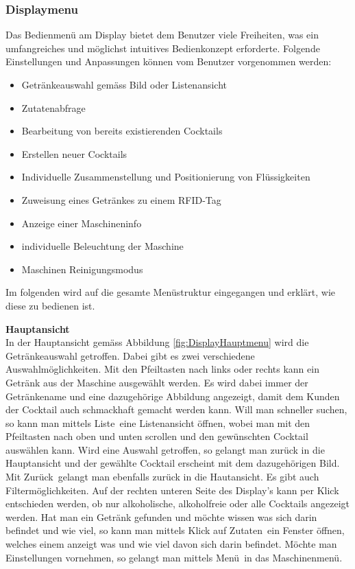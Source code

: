 \subsubsection{Displaymenu}
\label{subsubsec:Software_Displaymenu}

Das Bedienmenü am Display bietet dem Benutzer viele Freiheiten, was ein umfangreiches und möglichst intuitives Bedienkonzept erforderte. Folgende Einstellungen und Anpassungen können vom Benutzer vorgenommen werden:


\begin{itemize}
\item Getränkeauswahl gemäss Bild oder Listenansicht
\item Zutatenabfrage
\item Bearbeitung von bereits existierenden Cocktails
\item Erstellen neuer Cocktails 
\item Individuelle Zusammenstellung und Positionierung von Flüssigkeiten
\item Zuweisung eines Getränkes zu einem RFID-Tag
\item Anzeige einer Maschineninfo
\item individuelle Beleuchtung der Maschine
\item Maschinen Reinigungsmodus
\end{itemize}

Im folgenden wird auf die gesamte Menüstruktur eingegangen und erklärt, wie diese zu bedienen ist.

\textbf{Hauptansicht}\\
In der Hauptansicht gemäss Abbildung \ref{fig:DisplayHauptmenu} wird die Getränkeauswahl getroffen. Dabei gibt es zwei verschiedene Auswahlmöglichkeiten. Mit den Pfeiltasten nach links oder rechts kann ein Getränk aus der Maschine ausgewählt werden. Es wird dabei immer der Getränkename und eine dazugehörige Abbildung angezeigt, damit dem Kunden der Cocktail auch schmackhaft gemacht werden kann. Will man schneller suchen, so kann man mittels \flqq Liste\frqq~eine Listenansicht öffnen, wobei man mit den Pfeiltasten nach oben und unten scrollen und den gewünschten Cocktail auswählen kann. Wird eine Auswahl getroffen, so gelangt man zurück in die Hauptansicht und der gewählte Cocktail erscheint mit dem dazugehörigen Bild. Mit \flqq Zurück\frqq~gelangt man ebenfalls zurück in die Hautansicht. Es gibt auch Filtermöglichkeiten. Auf der rechten unteren Seite des Display's kann per Klick entschieden werden, ob nur alkoholische, alkoholfreie oder alle Cocktails angezeigt werden. Hat man ein Getränk gefunden und möchte wissen was sich darin befindet und wie viel, so kann man mittels Klick auf \flqq Zutaten\frqq~ein Fenster öffnen, welches einem anzeigt was und wie viel davon sich darin befindet. Möchte man Einstellungen vornehmen, so gelangt man mittels \flqq Menü\frqq~in das Maschinenmenü.

